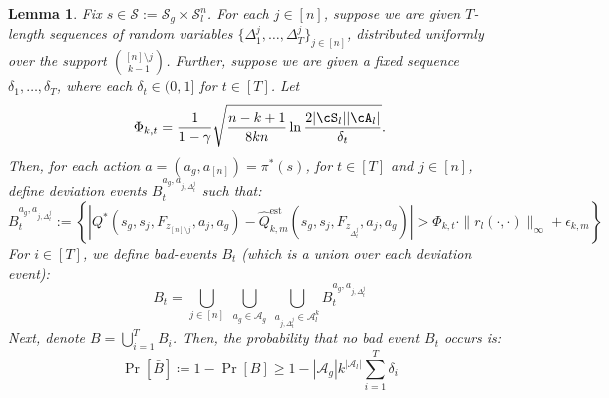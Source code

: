 \documentclass{article}
\theoremstyle{plain}
\newtheorem{lemma}[theorem]{Lemma}
\theoremstyle{definition}
\def\est{\mathrm{est}}
\begin{document}
\begin{lemma}\label{lemma:union_bound_one_over_finite_time}
Fix $s\in \mathcal{S}:=\mathcal{S}_g\times\mathcal{S}_l^n$. For each $j\in[n]$, suppose we are given $T$-length sequences of random variables $\{\Delta^j_1, \dots, \Delta^j_T\}_{j\in[n]}$, distributed uniformly over the support ${[n]\setminus j\choose k-1}$. Further, suppose we are given a fixed sequence $\delta_1,\dots,\delta_T$, where each $\delta_t\in (0,1]$ for $t\in[T]$. Let \[\Phi_{k,t} = \frac{1}{1-\gamma}\sqrt{\frac{n-k+1}{8kn} \ln \frac{2|\cS_l||\cA_l|}{\delta_t}}.\]Then, for each action $a = (a_g, a_{[n]}) = \pi^*(s)$, for $t\in[T]$ and $j\in[n]$, define \emph{deviation events} $B_t^{a_g,a_{j,\Delta_t^j}}$ such that:
    \begin{equation}
        B_t^{a_g,a_{j, \Delta_t^j}}\!:=\!\left\{\left|{Q}^*(s_g, s_j, F_{z_{[n]\setminus j}}, a_j, a_g)\!-\!\hat{Q}_{k,m}^{\est}(s_g, s_{j}, F_{z_{\Delta_t^j}}, a_j, a_g)\right|\!>\Phi_{k,t} \cdot\|r_l(\cdot,\cdot)
    \|_\infty + \epsilon_{k,m}\right\}
    \end{equation}
     For $i\in[T]$, we define bad-events $B_t$ (which is a union over each deviation event):
    \[B_t = \bigcup_{j\in[n]}\bigcup_{\substack{a_g \in \mathcal{A}_g}}\bigcup_{a_{j,\Delta_t^j}\in\mathcal{A}_l^k} B_t^{a_g,a_{j,\Delta_t^j}}\]
    Next, denote $B = \bigcup_{i=1}^T B_i$.
    Then, the probability that  no bad event $B_t$ occurs is:
    \[\Pr\left[\bar{B}\right]\coloneq 1-\Pr[B] \geq 1- |\mathcal{A}_g|k^{|\mathcal{A}_l|}\sum_{i=1}^T \delta_i\]
\end{lemma}
\end{document}
